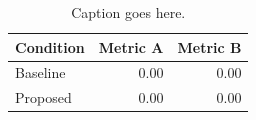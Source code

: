 \begin{table}[htbp]
  \centering
  \caption{Caption goes here.}
  \label{tab:label-here}
  \begin{tabular}{lrr}
    \hline
    Condition & Metric A & Metric B \\
    \hline
    Baseline  & 0.00     & 0.00     \\
    Proposed  & 0.00     & 0.00     \\
    \hline
  \end{tabular}
\end{table}
